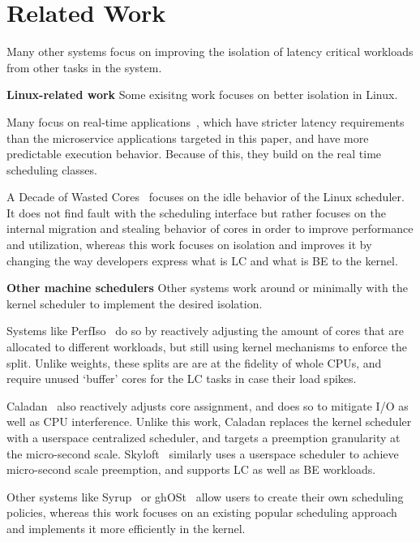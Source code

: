 \section{Related Work}

Many other systems focus on improving the isolation of latency critical
workloads from other tasks in the system.

\textbf{Linux-related work} Some exisitng work focuses on better isolation in
Linux. 

Many focus on real-time applications~\cite{rt-in-linux, state-rt-linux}, which have
stricter latency requirements than the microservice applications targeted in
this paper, and have more predictable execution behavior. Because of this, they
build on the real time scheduling classes.

A Decade of Wasted Cores~\cite{wasted-cores} focuses on the idle behavior of the
Linux scheduler. It does not find fault with the scheduling interface but rather
focuses on the internal migration and stealing behavior of cores in order to
improve performance and utilization, whereas this work focuses on isolation and
improves it by changing the way developers express what is LC and what is BE to
the kernel.

\textbf{Other machine schedulers} Other systems work around or minimally with
the kernel scheduler to implement the desired isolation.

Systems like PerfIso~\cite{perfiso} do so by reactively adjusting the amount of
cores that are allocated to different workloads, but still using kernel
mechanisms to enforce the split. Unlike \cgroups{} weights, these splits are are
at the fidelity of whole CPUs, and require unused `buffer' cores for the LC
tasks in case their load spikes.

Caladan~\cite{caladan} also reactively adjusts core assignment, and does so to
mitigate I/O as well as CPU interference. Unlike this work, Caladan replaces the
kernel scheduler with a userspace centralized scheduler, and targets a
preemption granularity at the micro-second scale. Skyloft~\cite{skyloft}
similarly uses a userspace scheduler to achieve micro-second scale preemption,
and supports LC as well as BE workloads.

Other systems like Syrup~\cite{syrup} or ghOSt~\cite{ghost} allow users to
create their own scheduling policies, whereas this work focuses on an existing
popular scheduling approach and implements it more efficiently in the kernel. 



